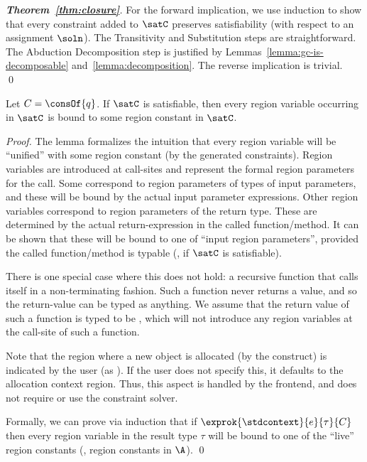 
\begin{proof}[\textbf{Theorem~\ref{thm:closure}}]
  For the forward implication, we use induction to show that every constraint
  added to $\satC$ preserves satisfiability (with respect to an assignment $\soln$).
  The Transitivity and Substitution steps are straightforward. The Abduction Decomposition
  step is justified by Lemmas~\ref{lemma:gc-is-decomposable} and~\ref{lemma:decomposition}.
  The reverse implication is trivial.
\qed
\end{proof}

\begin{lemma}
  \label{lemma:completely-bound}
Let $C = \consOf{q}$. If $\satC$ is satisfiable, then
every region variable occurring in $\satC$ is bound to some region constant in $\satC$.
\end{lemma}

\begin{proof}
The lemma formalizes the intuition that every region variable will be ``unified'' with
some region constant (by the generated constraints).
%
Region variables are introduced at call-sites and represent the formal region parameters for the call.
Some correspond to region parameters of types of input parameters, and these will be bound by the
actual input parameter expressions. Other region variables correspond to region parameters of the
return type. These are determined by the actual return-expression in the called function/method.
It can be shown that these will be bound to one of ``input region parameters'', provided the called
function/method is typable (\ie, if $\satC$ is satisfiable).

There is one special case where this does not hold: a recursive function
that calls itself in a non-terminating fashion. Such a function never
returns a value, and so the return-value can be typed as anything.
We assume that the return value of such a function is typed to be ,
which will not introduce any region variables at the call-site of such a function.

Note that the region  where a new object is allocated (by the  construct) is indicated
by the user (as ). If the user does not specify this, it defaults to the allocation
context region. Thus, this aspect is handled by the frontend, and does not require or use
the constraint solver.

Formally, we can prove via induction that if $\exprok{\stdcontext}{e}{\tau}{C}$ then
every region variable in the result type $\tau$ will be bound to one of the ``live''
region constants (\ie, region constants in $\A$).
\qed

\end{proof}

